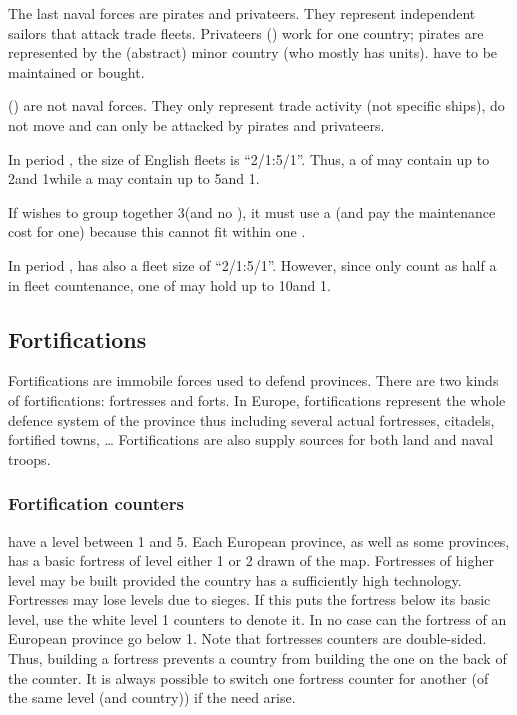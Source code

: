 \aparag[Pirates.] The last naval forces are pirates and privateers. They
represent independent sailors that attack trade fleets. Privateers (\corsaire)
work for one country; pirates are represented by the (abstract) minor country
 (who mostly has \corsaire units). \corsaire have to be
maintained or bought.

 (\TradeFLEET) are not naval forces. They only represent
trade activity (not specific ships), do not move and can only be attacked by
pirates and privateers.

\begin{exemple}
  In period , the size of English fleets is ``2/1:5/1''. Thus, a
  \FLEET\Facemoins of \ANG may contain up to 2\NWD and 1\NTD while a
  \FLEET\Faceplus may contain up to 5\NWD and 1\NTD.

  If \ANG wishes to group together 3\NWD (and no \NTD), it must use a
  \FLEET\Faceplus (and pay the maintenance cost for one) because this cannot
  fit within one \FLEET\Facemoins.

  In period , \TUR has also a fleet size of ``2/1:5/1''. However,
  since \NGD only count as half a \ND in fleet countenance, one
  \FLEET\Faceplus of \TUR may hold up to 10\NGD and 1\NTD.
\end{exemple}



\subsection{Fortifications}

\aparag Fortifications are immobile forces used to defend provinces. There are
two kinds of fortifications: fortresses and forts. In Europe, fortifications
represent the whole defence system of the province thus including several
actual fortresses, citadels, fortified towns, \ldots
\bparag Fortifications are also supply sources for both land and naval troops.

\subsubsection{Fortification counters}
\aparag[Fortresses] have a level between 1 and 5.
\bparag Each European province, as well as some \ROTW provinces, has a basic
fortress of level either 1 or 2 drawn of the map.
\bparag Fortresses of higher level may be built provided the country has a
sufficiently high technology.
\bparag Fortresses may lose levels due to sieges. If this puts the fortress
below its basic level, use the white level 1 counters to denote it. In no case
can the fortress of an European province go below 1.
\bparag Note that fortresses counters are double-sided. Thus, building a
fortress prevents a country from building the one on the back of the
counter. It is always possible to switch one fortress counter for another (of
the same level (and country)) if the need arise.

